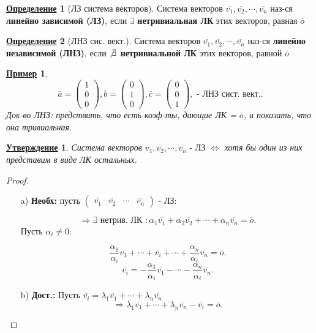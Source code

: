 \documentclass[12pt]{article}
\newtheorem{statement}{\underline{Утверждение}}[section]
\newtheorem*{example}{\underline{Пример}}
\theoremstyle{definition}
\newtheorem{definition}{\underline{Определение}}[section]
\theoremstyle{definition}
\begin{document}
\begin{definition}[ЛЗ система векторов]
Система векторов $\overline{v_1}, \overline{v_2}, \cdots, \overline{v_n}$ наз-ся \textbf{линейно зависимой (ЛЗ)}, если $\exists $ \textbf{нетривиальная ЛК} этих векторов, равная $\overline{o}$
\end{definition}

\begin{definition} [ЛНЗ сис. вект.]
Система векторов $\overline{v_1}, \overline{v_2}, \cdots , \overline{v_n}$ наз-ся \textbf{линейно независимой (ЛНЗ)}, если \textbf{$ \not\exists $ нетривиальной ЛК} этих векторов, равной $\overline{o}$
\end{definition}
\begin{example}
\[
\overline{a} = \begin{pmatrix}1 \\ 0 \\ 0 \end{pmatrix}, \overline{b} = \begin{pmatrix}0 \\ 1 \\ 0 \end{pmatrix}, \overline{c} = \begin{pmatrix}0 \\ 0 \\ 1 \end{pmatrix}, \text{ - ЛНЗ сист. вект.}
.\] 
Док-во ЛНЗ: предствить, что есть коэф-ты, дающие ЛК = $\overline{o}$, и показать, что она тривиальная.
\end{example}
\begin{statement}
Система векторов $\overline{v_1}, \overline{v_2}, \cdots , \overline{v_n} \text{ - ЛЗ } \iff $ хотя бы один из них представим в виде ЛК остальных.
\end{statement}
\begin{proof}
\begin{itemize}
    \item [a) ] \textbf{Необх:} пусть $\begin{pmatrix} \overline{v_1} & \overline{v_2} & \cdots & \overline{v_n} \end{pmatrix} $ - ЛЗ:

        \[
        \Rightarrow \exists \text{ нетрив. ЛК } \colon \alpha_1 \overline{v_1} + \alpha_2 \overline{v_2} + \cdots + \alpha_n \overline{v_n} = \overline{o}
        .\] 
        Пусть $\alpha_i \neq 0 \colon $ 

        \[
        \frac{\alpha_1}{\alpha_i} \overline{v_1} + \cdots + \overline{v_i} + \cdots + \frac{\alpha_n}{\alpha_i}  \overline{v_n} = \overline{o}
        .\] 
    \[
    \overline{v_i} = -\frac{\alpha_1}{\alpha_i} \overline{v_1} - \cdots - \frac{\alpha_n}{\alpha_i} \overline{v_n}
    .\] 
\item [b) ] \textbf{Дост.:} Пусть $\overline{v_i} = \lambda_1 \overline{v_1} + \cdots +  \lambda_n \overline{v_n}$ 
\[
\Rightarrow \lambda_1 \overline{v_1} + \cdots + \lambda_n \overline{v_n} - \overline{v_i} = \overline{o}
.\] 
\end{itemize}
\end{proof}
\end{document}
